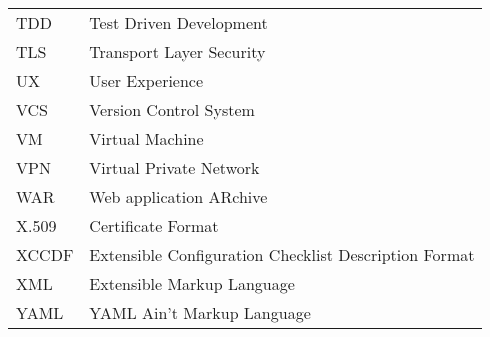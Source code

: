 \begin{longtable}{p{3cm}p{10cm}}
TDD&Test Driven Development\\
TLS&Transport Layer Security\\
UX&User Experience\\
VCS&Version Control System\\
VM&Virtual Machine\\
VPN&Virtual Private Network\\
WAR&Web application ARchive\\
X.509&Certificate Format\\
XCCDF&Extensible Configuration Checklist Description Format\\
XML&Extensible Markup Language\\
YAML&YAML Ain't Markup Language\\
\end{longtable}
\addtocounter{table}{-1} 